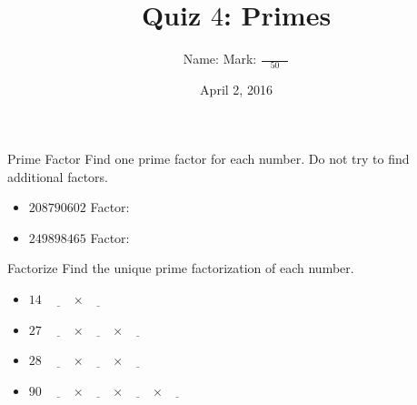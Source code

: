 \documentclass[12pt,letterpaper]{article}
\title{Quiz $4$: Primes}
\author{Name: \underline{\hspace{5cm}} Mark: $\displaystyle \frac{\hspace{3em}}{50}$}
\date{April 2, 2016}
\begin{document}
\maketitle

\thispagestyle{empty}

\begin{problem}{Prime Factor}
 Find one prime factor for each number. Do not try to find additional factors.

 \begin{itemize}
  \item $208790602$ \hfill Factor: \underline{\hspace{2em}}
  \item $249898465$ \hfill Factor: \underline{\hspace{2em}}
 \end{itemize}

\end{problem}

\begin{problem}{Factorize}
 Find the unique prime factorization of each number.

 \begin{itemize}
  \item $14$ \hfill $\underline{\hspace{2em}} \times
  \underline{\hspace{2em}}$
  \item $27$ \hfill $\underline{\hspace{2em}} \times
  \underline{\hspace{2em}} \times \underline{\hspace{2em}}$
  \item $28$ \hfill $\underline{\hspace{2em}} \times
  \underline{\hspace{2em}} \times
  \underline{\hspace{2em}}$
  \item $90$ \hfill $\underline{\hspace{2em}} \times
  \underline{\hspace{2em}} \times \underline{\hspace{2em}}
  \times \underline{\hspace{2em}}$
 \end{itemize}
\end{problem}
\end{document}
